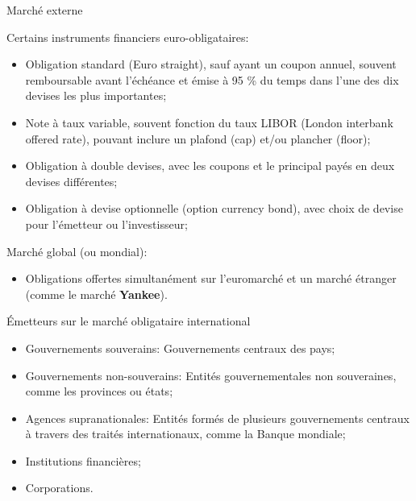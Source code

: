 \documentclass{beamer}
\begin{document}
\begin{frame}{Marché externe}
\begin{block}{Certains instruments financiers euro-obligataires:}
\begin{itemize}
\item Obligation standard (Euro straight), sauf ayant un coupon annuel, souvent remboursable avant l’échéance et émise à 95 \% du temps dans l’une des dix devises les plus importantes;
\item Note à taux variable, souvent fonction du taux LIBOR (London interbank offered rate), pouvant inclure un plafond (cap) et/ou plancher (floor);
\item Obligation à double devises, avec les coupons et le principal payés en deux devises différentes;
\item Obligation à devise optionnelle (option currency bond), avec choix de devise pour l’émetteur ou l’investisseur; 
\end{itemize}
\end{block}
\begin{block}{Marché global (ou mondial): }
\begin{itemize}
\item Obligations offertes simultanément sur l’euromarché et un marché étranger (comme le marché \textbf{Yankee}).  
\end{itemize}
\end{block}
\end{frame}

\begin{frame}{Émetteurs sur le marché obligataire international}
\begin{itemize}
\item Gouvernements souverains: Gouvernements centraux des pays;
\item Gouvernements non-souverains: Entités gouvernementales non souveraines, comme les provinces ou états;
\item Agences supranationales: Entités formés de plusieurs gouvernements centraux à travers des traités internationaux, comme la Banque mondiale; 
\item Institutions financières;
\item Corporations. 
\end{itemize}
\end{frame}
\end{document}
